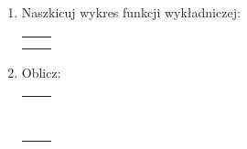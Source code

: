 \documentclass[12pt,a4paper]{article}
\begin{document}
\begin{enumerate}[1.]
\begin{enumerate}[a)]
\begin{tabular}{p{7cm} p{7cm}}
		\end{tabular} \end{enumerate}
	
	\item Naszkicuj wykres funkcji wykładniczej:
	
		\begin{enumerate}[a)] \begin{tabular}{p{7cm} p{7cm}}
			\item $f(x)=2^x$& \vspace{0.4cm}\item $g(x)=3^{-x}$ \\
			\item $h(x)=2^{x+3}-2$& \item$i(x)=\frac{1}{2}^{x-2}+1$ \\
	\end{tabular} \end{enumerate}
	
	
	\newpage
	
	\item Oblicz:
	
			\begin{enumerate}[a)] \begin{tabular}{p{7cm} p{7cm}}
			\item $\log_28=$& \vspace{0.4cm}\item $\log_232=$ \\
			\item $\log_2512=$& \item$\log_4256=$ \\
			\item $\log_381=$& \item$\log_981=$ \\
			\item $\log_3\frac{1}{27}=$& \item$\log_6\frac{1}{216}=$ \\
			\item $\log_\frac{1}{2}\frac{1}{16}=$& \item$\log_\frac{2}{3}\frac{3}{2}=$ \\
			\item $\log_749=$& \item$\log_51=$ \\
			\item $\log_\frac{1}{4}16=$& \item$\log_5\frac{1}{625}=$ \\
			\item $\log100=$& \item$\log0,001=$ \\
			

\end{tabular}
\end{enumerate}
\end{enumerate}
\end{document}
